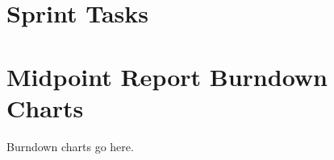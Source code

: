 \documentclass[conference]{IEEEtran}
\begin{document}
\section{Sprint Tasks}






\section{Midpoint Report Burndown Charts}
Burndown charts go here.


\end{document}
